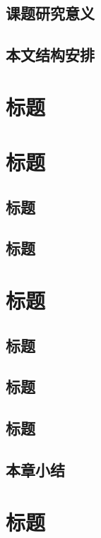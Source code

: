 \documentclass[openany,AutoFakeBold]{book}
\theoremstyle{definition}
\begin{document}
\section{课题研究意义}



\section{本文结构安排}



\chapter{标题}    %
\pagestyle{fancy}


\chapter{标题}
\pagestyle{fancy}


\section{标题}





\section{标题}


\chapter{标题}
\pagestyle{fancy}
\section{标题}

\section{标题}


\section{标题}


\section{本章小结}


\chapter{标题}
\pagestyle{fancy}
\end{document}
